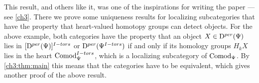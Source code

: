 \begin{addendum}
    This result, and others like it, was one of the inspirations for writing the paper \cite{aambo_2024_localizing} --- see \cref{ch3}. There we prove some uniqueness results for localizing subcategories that have the property that heart-valued homotopy groups can detect objects. For the above example, both categories have the property that an object $X\in \mathrm{D}^{per}(\Psi)$ lies in $[\mathrm{D}^{per}(\Psi)]^{I-tors}$ or $\mathrm{D}^{per}(\Psi^{I-tors})$ if and only if its homology groups $H_k X$ lies in the heart $\mathrm{Comod}_\Psi^{I-tors}$, which is a localizing subcategory of $\mathrm{Comod}_\Psi$. By \cref{ch3:thm:main} this means that the categories have to be equivalent, which gives another proof of the above result. 
\end{addendum}


